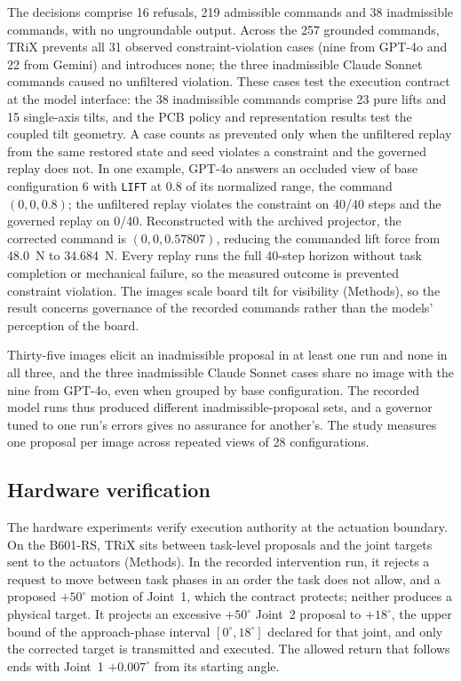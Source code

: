 \documentclass[12pt]{article}
\begin{document}
The decisions comprise 16 refusals, 219 admissible commands and 38
inadmissible commands, with no ungroundable output. Across the 257 grounded
commands, TRiX prevents all 31 observed constraint-violation cases (nine from GPT-4o and 22 from Gemini) and introduces none; the three inadmissible Claude Sonnet commands caused no unfiltered violation. These cases test the execution contract at the model interface: the 38 inadmissible commands comprise 23 pure lifts and 15 single-axis tilts, and the PCB policy and representation results test the coupled tilt geometry. A case
counts as prevented only when the unfiltered replay from the same restored
state and seed violates a constraint and the governed replay does not. In one
example, GPT-4o answers an occluded view of base configuration 6 with
\texttt{LIFT} at 0.8 of its normalized range, the command $(0,0,0.8)$; the
unfiltered replay violates the constraint on 40/40 steps and the governed
replay on 0/40. Reconstructed with the archived projector, the corrected command is $(0,0,0.57807)$, reducing the
commanded lift force from 48.0~N to 34.684~N. Every replay runs the full 40-step horizon without task
completion or mechanical failure, so the measured outcome is prevented
constraint violation. The images scale board tilt for visibility (Methods), so
the result concerns governance of the recorded commands rather than the
models' perception of the board.

Thirty-five images elicit an
inadmissible proposal in at least one run and none in all three, and the three
inadmissible Claude Sonnet cases share no image with the nine from GPT-4o, even
when grouped by base configuration. The recorded model runs thus produced different inadmissible-proposal sets, and a governor tuned to one run's errors
gives no assurance for another's. The study measures one
proposal per image across repeated views of 28 configurations.

\subsection{Hardware verification}
\label{sec:hardware-results}
The hardware experiments verify execution authority at the actuation boundary.
On the B601-RS, TRiX sits between task-level proposals and the joint targets sent
to the actuators (Methods). In the recorded intervention run, it rejects a request to move
between task phases in an order the task does not allow, and a proposed
$+50^\circ$ motion of Joint~1, which the contract protects; neither produces a
physical target. It projects an excessive $+50^\circ$ Joint~2 proposal to $+18^\circ$, the upper bound of the approach-phase interval $[0^\circ,18^\circ]$ declared for that joint, and only the corrected target is transmitted and executed. The
allowed return that follows ends with Joint~1 $+0.007^\circ$ from its starting
angle.
\end{document}
